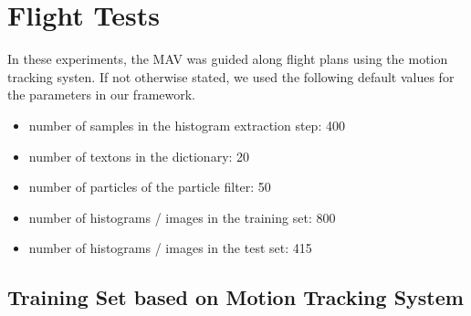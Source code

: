 \documentclass[11pt]{report}
\begin{document}



%

\section{Flight Tests}

In these experiments, the MAV was guided along flight plans using the
motion tracking systen. If not otherwise stated, we used the following
default values for the parameters in our framework.
\begin{itemize}
\item number of samples in the histogram extraction step: 400
\item number of textons in the dictionary: 20
\item number of particles of the particle filter: 50
\item number of histograms / images in the training set: 800
\item number of histograms / images in the test set: 415
\end{itemize}

\subsection{Training Set based on Motion Tracking System}
\label{sec:experiment-real}
\end{document}
